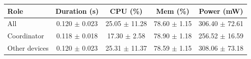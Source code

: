 \begin{tabular}{lcccc}
\hline
\textbf{Role} & \textbf{Duration (s)} & \textbf{CPU (\%)} & \textbf{Mem (\%)} & \textbf{Power (mW)} \\
\hline
All & 0.120 $\pm$ 0.023 & 25.05 $\pm$ 11.28 & 78.60 $\pm$ 1.15 & 306.40 $\pm$ 72.61 \\
Coordinator & 0.118 $\pm$ 0.018 & 17.30 $\pm$ 2.58 & 78.90 $\pm$ 1.18 & 256.52 $\pm$ 16.59 \\
Other devices & 0.120 $\pm$ 0.023 & 25.31 $\pm$ 11.37 & 78.59 $\pm$ 1.15 & 308.06 $\pm$ 73.18 \\
\hline
\end{tabular}
